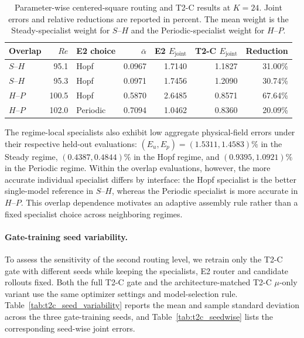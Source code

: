 \begin{table}[!htbp]
\centering
\caption{
Parameter-wise centered-square routing and T2-C results at $K=24$.
Joint errors and relative reductions are reported in percent.
The mean weight is the Steady-specialist weight for $S$--$H$
and the Periodic-specialist weight for $H$--$P$.
}
\label{tab:square_parameter}
\small
\setlength{\tabcolsep}{3.5pt}
\begin{tabular}{lrlrrrr}
\toprule
Overlap & $Re$ & E2 choice & $\bar\alpha$ & E2 $E_{\mathrm{joint}}$ & T2-C $E_{\mathrm{joint}}$ & Reduction \\
\midrule
$S$--$H$ & 95.1 & Hopf & 0.0967 & 1.7140 & 1.1827 & 31.00\% \\
$S$--$H$ & 95.3 & Hopf & 0.0971 & 1.7456 & 1.2090 & 30.74\% \\
$H$--$P$ & 100.5 & Hopf & 0.5870 & 2.6485 & 0.8571 & 67.64\% \\
$H$--$P$ & 102.0 & Periodic & 0.7094 & 1.0462 & 0.8360 & 20.09\% \\
\bottomrule
\end{tabular}
\end{table}

The regime-local specialists also exhibit low aggregate physical-field errors under their respective held-out evaluations: $(E_u,E_p)=(1.5311,1.4583)\%$ in the Steady regime, $(0.4387,0.4844)\%$ in the Hopf regime, and $(0.9395,1.0921)\%$ in the Periodic regime. Within the overlap evaluations, however, the more accurate individual specialist differs by interface: the Hopf specialist is the better single-model reference in $S$--$H$, whereas the Periodic specialist is more accurate in $H$--$P$. This overlap dependence motivates an adaptive assembly rule rather than a fixed specialist choice across neighboring regimes.




\paragraph{Gate-training seed variability.}
To assess the sensitivity of the second routing level, we retrain only the T2-C gate with different seeds while keeping the specialists, E2 router and candidate rollouts fixed. Both the full T2-C gate and the architecture-matched T2-C $\mu$-only variant
use the same optimizer settings and model-selection rule.
Table~\ref{tab:t2c_seed_variability} reports the mean and sample standard deviation across the three gate-training seeds, and
Table~\ref{tab:t2c_seedwise} lists the corresponding seed-wise joint errors.




